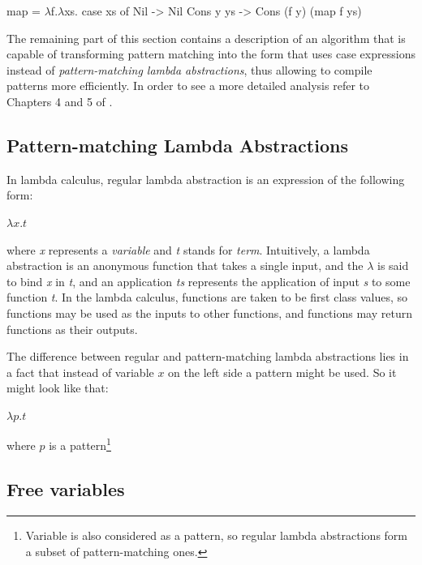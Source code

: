 \documentclass[12pt,a4paper]{report}
\begin{document}
\vspace*{0.2in}
\begin{code}[style=haskell,mathescape=true]
map = $\lambda$f.$\lambda$xs.
    case xs of
        Nil       -> Nil
        Cons y ys -> Cons (f y) (map f ys)
\end{code}

The remaining part of this section contains a description of an algorithm that
is capable of transforming pattern matching into the form that uses case
expressions instead of \textit{pattern-matching lambda abstractions}, thus allowing to
compile patterns more efficiently. In order to see a more detailed analysis
refer to Chapters 4 and 5 of \cite{Jon87}.

\subsection{Pattern-matching Lambda Abstractions}
In lambda calculus, regular lambda abstraction is an expression of the
following form:

\vspace*{0.2in}
\begin{code}[style=haskell,mathescape=true]
$\lambda x.t$
\end{code}

where \textit{x} represents a \textit{variable} and \textit{t} stands for
\textit{term}. Intuitively, a lambda abstraction is an anonymous function that
takes a single input, and the \(\lambda\) is said to bind \textit{x} in
\textit{t}, and an application \textit{ts} represents the application of input
\textit{s} to some function \textit{t}. In the lambda calculus, functions are
taken to be first class values, so functions may be used as the inputs to other
functions, and functions may return functions as their outputs.

The difference between regular and pattern-matching lambda abstractions lies in
a fact that instead of variable $x$ on the left side a pattern might be
used. So it might look like that:

\vspace*{0.2in}
\begin{code}[style=haskell,mathescape=true]
$\lambda p.t$
\end{code}

where $p$ is a pattern\footnote{Variable is also considered as a
pattern, so regular lambda abstractions form a subset of pattern-matching ones.}

\subsection{Free variables}
\label{sec:free_variable}
\end{document}
